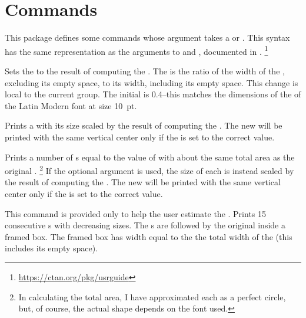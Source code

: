 \documentclass{beery}
\begin{document}
\section{Commands}
\label{sec:commands}

This package defines some commands whose argument takes a  or .
This syntax has the same representation as the arguments to  and , documented in .%
\footnote{\url{https://ctan.org/pkg/usrguide}}

 
\KeepNextPar*

Sets the \textbulletfactor{} to the result of computing the .
The \textbulletfactor{} is the ratio of the width of the , excluding its empty space, to its width, including its empty space.
This change is local to the current group.
The initial \textbulletfactor{} is \num{0.4}\---this matches the dimensions of the  of the Latin Modern font at size \qty{10}{pt}.

 
\KeepNextPar*

Prints a  with its size scaled by the result of computing the .
The new  will be printed with the same vertical center only if the \textbulletfactor{} is set to the correct value.

  
\KeepNextPar*

Prints a number of s equal to the value of  with about the same total area as the original .%
\footnote
  {%
    In calculating the total area, I have approximated each  as a perfect circle, but, of course, the actual shape depends on the font used.%
  }
If the optional argument is used, the size of each  is instead scaled by the result of computing the .
The new  will be printed with the same vertical center only if the \textbulletfactor{} is set to the correct value.

\KeepNextPar*

This command is provided only to help the user estimate the \textbulletfactor{}.
Prints \num{15} consecutive s with decreasing sizes.
The s are followed by the original  inside a framed box.
The framed box has width equal to the \textbulletfactor{} \texttimes{} the total width of the  (this includes its empty space).
\end{document}
